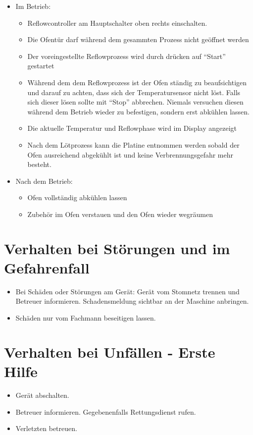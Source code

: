\documentclass[fontsize=9pt]{scrartcl}
\newenvironment{smallitemize}{\begin{itemize}\itemsep -3pt}{\end{itemize}}
\begin{document}
\begin{itemize}
\begin{smallitemize}
	\end{smallitemize}
	\item Im Betrieb:
	\begin{smallitemize}
		\item Reflowcontroller am Hauptschalter oben rechts einschalten.
		\item Die Ofentür darf während dem gesammten Prozess nicht geöffnet werden 
		\item Der voreingestellte Reflowprozess wird durch drücken auf \enquote{Start} gestartet
		\item Während dem dem Reflowprozess ist der Ofen ständig zu beaufsichtigen und darauf zu achten, dass sich der Temperatursensor nicht löst. 
		Falls sich dieser lösen sollte mit \enquote{Stop} abbrechen. Niemals versuchen diesen während dem Betrieb wieder zu befestigen, sondern erst abkühlen lassen.
		\item Die aktuelle Temperatur und Reflowphase wird im Display angezeigt
		\item Nach dem Lötprozess kann die Platine entnommen werden sobald der Ofen ausreichend abgekühlt ist und keine Verbrennungsgefahr mehr besteht.
		\end{smallitemize}
	\item Nach dem Betrieb:
	\begin{smallitemize}
		\item Ofen vollständig abkühlen lassen
		\item Zubehör im Ofen verstauen und den Ofen wieder wegräumen
	\end{smallitemize}

\end{itemize}

\section{Verhalten bei Störungen und im Gefahrenfall}
\begin{smallitemize}
	\item Bei Schäden oder Störungen am Gerät: Gerät vom Stomnetz trennen und Betreuer informieren. Schadensmeldung sichtbar an der Maschine anbringen.
	\item Schäden nur vom Fachmann beseitigen lassen.
\end{smallitemize}

\section{Verhalten bei Unfällen - Erste Hilfe}
\begin{smallitemize}
	\item Gerät abschalten. 
	\item Betreuer informieren. Gegebenenfalls Rettungsdienst rufen.
	\item Verletzten betreuen.
\end{smallitemize}
\end{document}

